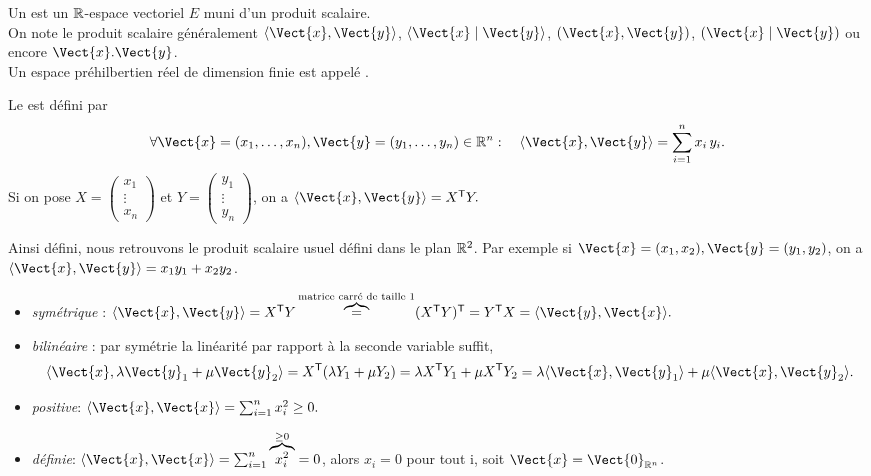 \documentclass{book}
\begin{document}
\begin{Definition}
Un   est un $\mathbb{R} $-espace vectoriel $E$ muni d'un produit scalaire.\\
On note le produit scalaire généralement $\langle \Vect{x}, \Vect{y} \rangle$, $\langle \Vect{x} \mid \Vect{y} \rangle$, $(\Vect{x},\Vect{y})$, $(\Vect{x}\mid \Vect{y})$ ou encore $\Vect{x}.\Vect{y}$.\\
Un espace préhilbertien réel de dimension finie est appelé .
\end{Definition}
\begin{DefinitionProposition}
Le  est défini par  
$$\forall \Vect{x} = ( x_1, \dots, x_n),\Vect{y} =( y_1, \dots, y_n) \in\R^n :\quad \PS{\Vect{x}}{\Vect{y}} =\sum_{i=1}^n x_i \, y_i.  $$
Si on pose $X=\begin{pmatrix}
x_1\\ \vdots \\ x_n 
\end{pmatrix}$ et $Y=\begin{pmatrix}
y_1\\ \vdots \\ y_n 
\end{pmatrix}$, on a $\PS{\Vect{x}}{\Vect{y}}=\transposee{X}Y.$
\end{DefinitionProposition}
Ainsi défini, nous retrouvons le produit scalaire usuel défini dans le plan $\mathbb{R}^2$. Par exemple si $\Vect{x} = ( x_1, x_2),\Vect{y} =( y_1, y_2)$, on a  $\PS{\Vect{x}}{\Vect{y}} =x_1 y_1+x_2 y_2$.
\begin{Demonstration}
\begin{itemize}
\item \emph{symétrique} : $\PS{\Vect{x}}{\Vect{y}}=\transposee{X}Y  \overbrace{=}^{\text{matrice carré de taille 1}} \transposee{(\transposee{X}Y)} = \transposee{Y}X =\PS{\Vect{y}}{\Vect{x}}.$
\item \emph{bilinéaire} : par symétrie la linéarité par rapport à la seconde variable suffit,   $$\PS{\Vect{x}}{\lambda \Vect{y}_1+\mu \Vect{y}_2}=\transposee{X}(\lambda Y_1+\mu Y_2)  =\lambda \transposee{X} Y_1+\mu \transposee{X} Y_2=\lambda \PS{\Vect{x}}{\Vect{y}_1}+\mu \PS{\Vect{x}}{\Vect{y}_2}  .$$
\item \emph{positive}: $\PS{\Vect{x}}{\Vect{x}}=\sum_{i=1}^n x_i^2 \geq 0.$
\item \emph{définie}: $\PS{\Vect{x}}{\Vect{x}}=\sum_{i=1}^n \overbrace{x_i^2}^{\geq 0} = 0$, alors  $x_i=0$ pour tout i, soit $\Vect{x}=\Vect{0}_{\R^n}$.
\end{itemize}
\end{Demonstration}
\end{document}
